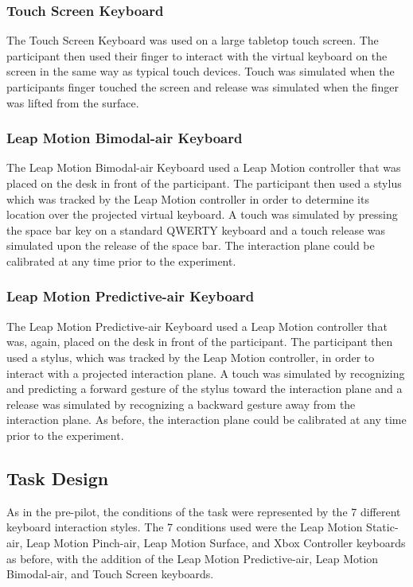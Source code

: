 \subsubsection{Touch Screen Keyboard}
The Touch Screen Keyboard was used on a large tabletop touch screen. The participant then used their finger to interact with the virtual keyboard on the screen in the same way as typical touch devices. Touch was simulated when the participants finger touched the screen and release was simulated when the finger was lifted from the surface.

\subsubsection{Leap Motion Bimodal-air Keyboard}
The Leap Motion Bimodal-air Keyboard used a Leap Motion controller that was placed on the desk in front of the participant. The participant then used a stylus which was tracked by the Leap Motion controller in order to determine its location over the projected virtual keyboard. A touch was simulated by pressing the space bar key on a standard QWERTY keyboard and a touch release was simulated upon the release of the space bar. The interaction plane could be calibrated at any time prior to the experiment.

\subsubsection{Leap Motion Predictive-air Keyboard}
The Leap Motion Predictive-air Keyboard used a Leap Motion controller that was, again, placed on the desk in front of the participant. The participant then used a stylus, which was tracked by the Leap Motion controller, in order to interact with a projected interaction plane. A touch was simulated by recognizing and predicting a forward gesture of the stylus toward the interaction plane and a release was simulated by recognizing a backward gesture away from the interaction plane. As before, the interaction plane could be calibrated at any time prior to the experiment.

\subsection{Task Design} \label{pilot_task_design}
As in the pre-pilot, the conditions of the task were represented by the 7 different keyboard interaction styles. The 7 conditions used were the Leap Motion Static-air, Leap Motion Pinch-air, Leap Motion Surface, and Xbox Controller keyboards as before, with the addition of the Leap Motion Predictive-air, Leap Motion Bimodal-air, and Touch Screen keyboards.

